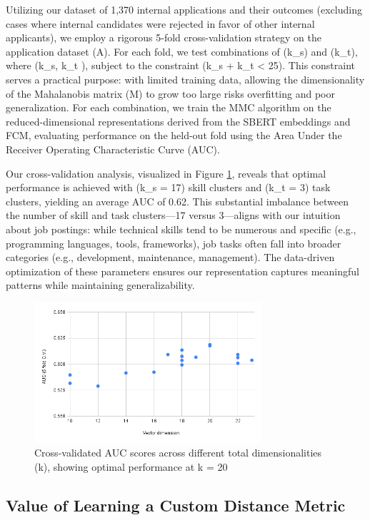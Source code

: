 Utilizing our dataset of 1,370 internal applications and their outcomes (excluding cases where internal 
candidates were rejected in favor of other internal applicants), we employ a rigorous 5-fold cross-validation 
strategy on the application dataset (A). For each fold, we test combinations of (k_s) and (k_t), where 
(k_s, k_t ), subject to the constraint (k_s + k_t < 25). This constraint serves a 
practical purpose: with limited training data, allowing the dimensionality of the Mahalanobis matrix (M) 
to grow too large risks overfitting and poor generalization. For each combination, we train the MMC algorithm 
on the reduced-dimensional representations derived from the SBERT embeddings and FCM, evaluating performance 
on the held-out fold using the Area Under the Receiver Operating Characteristic Curve (AUC).

Our cross-validation analysis, visualized in Figure \ref{fig:AUC}, reveals that optimal performance 
is achieved with (k_s = 17) skill clusters and (k_t = 3) task clusters, yielding an average AUC of 0.62. 
This substantial imbalance between the number of skill and task clusters—17 versus 3—aligns with our intuition 
about job postings: while technical skills tend to be numerous and specific (e.g., programming languages, 
tools, frameworks), job tasks often fall into broader categories (e.g., development, maintenance, management). 
The data-driven optimization of these parameters ensures our representation captures meaningful patterns while 
maintaining generalizability.

\begin{figure}[htb]
\centering
\includegraphics[width=0.75\textwidth]{new_img/chart.png}
\caption{Cross-validated AUC scores across different total dimensionalities (k), showing optimal performance at k = 20}
\label{fig:AUC}
\end{figure}

\subsection{Value of Learning a Custom Distance Metric}

